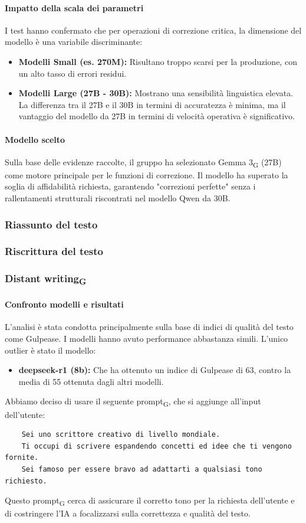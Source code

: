 \documentclass[11pt,a4paper]{article}
\newcommand{\gls}[1]{#1\textsubscript{G}}
\begin{document}
\paragraph{Impatto della scala dei parametri}
I test hanno confermato che per operazioni di correzione critica, la dimensione del modello è una variabile discriminante:
\begin{itemize}
    \item \textbf{Modelli Small (es. 270M):} Risultano troppo scarsi per la produzione, con un alto tasso di errori residui.
    \item \textbf{Modelli Large (27B - 30B):} Mostrano una sensibilità linguistica elevata. La differenza tra il 27B e il 30B in termini di accuratezza è minima, ma il vantaggio del modello da 27B in termini di velocità operativa è significativo.
\end{itemize}
\paragraph{Modello scelto}
Sulla base delle evidenze raccolte, il gruppo ha selezionato \gls{Gemma 3} (27B) come motore principale per le funzioni di correzione. Il modello ha superato la soglia di affidabilità richiesta, garantendo "correzioni perfette" senza i rallentamenti strutturali riscontrati nel modello Qwen da 30B.

\subsubsection{Riassunto del testo}
\subsubsection{Riscrittura del testo}
\subsubsection{\gls{Distant writing}}

 \paragraph{Confronto modelli e risultati}
 L'analisi è stata condotta principalmente sulla base di indici di qualità del testo come Gulpease.
 I modelli hanno avuto performance abbastanza simili. L'unico outlier è stato il modello:
 \begin{itemize}
    \item \textbf{deepseek-r1 (8b):} Che ha ottenuto un indice di Gulpease di 63, contro la media di 55 ottenuta dagli altri modelli.\\
 \end{itemize}
Abbiamo deciso di usare il seguente \gls{prompt}, che si aggiunge all'input dell'utente: 
\begin{verbatim}
    Sei uno scrittore creativo di livello mondiale.
    Ti occupi di scrivere espandendo concetti ed idee che ti vengono fornite. 
    Sei famoso per essere bravo ad adattarti a qualsiasi tono richiesto.
\end{verbatim} 
Questo \gls{prompt} cerca di assicurare il corretto tono per la richiesta dell'utente e di costringere l'IA a focalizzarsi sulla correttezza e qualità del testo.
\end{document}
